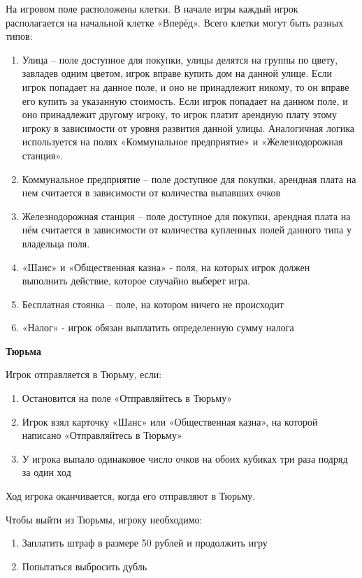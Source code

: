 \begin{Large}
На игровом поле расположены клетки. В начале игры каждый игрок располагается на начальной клетке «Вперёд». Всего клетки могут быть разных типов:
\begin{spacing}{0.9}
\begin{enumerate}
    \item Улица – поле доступное для покупки, улицы делятся на группы по цвету, завладев одним цветом, игрок вправе купить дом на данной улице. Если игрок попадает на данное поле, и оно не принадлежит никому, то он вправе его купить за указанную стоимость. Если игрок попадает на данном поле, и оно принадлежит другому игроку, то игрок платит арендную плату этому игроку в зависимости от уровня развития данной улицы. Аналогичная логика используется на полях «Коммунальное предприятие» и «Железнодорожная станция». 
    \item Коммунальное предприятие – поле доступное для покупки, арендная плата на нем считается в зависимости от количества выпавших очков
    \item Железнодорожная станция – поле доступное для покупки, арендная плата на нём считается в зависимости от количества купленных полей данного типа у владельца поля.
    \item «Шанс» и «Общественная казна» -  поля, на которых игрок должен выполнить действие, которое случайно выберет игра.
    \item Бесплатная стоянка – поле, на котором ничего не происходит
    \item «Налог» - игрок обязан выплатить определенную сумму налога
\end{enumerate}
\end{spacing}

\textbf{Тюрьма}

Игрок отправляется в Тюрьму, если:
\begin{spacing}{0.9}
\begin{enumerate}
    \item Остановится на поле «Отправляйтесь в Тюрьму» 
    \item Игрок взял карточку «Шанс» или «Общественная казна», на которой написано «Отправляйтесь в Тюрьму»
    \item У игрока выпало одинаковое число очков на обоих кубиках три раза подряд за один ход
\end{enumerate}
\end{spacing}

Ход игрока оканчивается, когда его отправляют в Тюрьму. 

Чтобы выйти из Тюрьмы, игроку необходимо:
\begin{spacing}{0.9}
\begin{enumerate}
    \item Заплатить штраф в размере 50 рублей и продолжить игру
    \item Попытаться выбросить дубль
\end{enumerate}
\end{spacing}


\end{Large}
